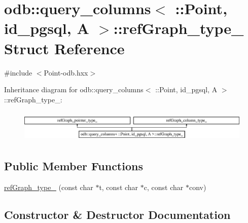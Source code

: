 \hypertarget{structodb_1_1query__columns_3_01_1_1_point_00_01id__pgsql_00_01_a_01_4_1_1ref_graph__type__}{}\section{odb\+:\+:query\+\_\+columns$<$ \+:\+:Point, id\+\_\+pgsql, A $>$\+:\+:ref\+Graph\+\_\+type\+\_\+ Struct Reference}
\label{structodb_1_1query__columns_3_01_1_1_point_00_01id__pgsql_00_01_a_01_4_1_1ref_graph__type__}


{\ttfamily \#include $<$Point-\/odb.\+hxx$>$}

Inheritance diagram for odb\+:\+:query\+\_\+columns$<$ \+:\+:Point, id\+\_\+pgsql, A $>$\+:\+:ref\+Graph\+\_\+type\+\_\+\+:\begin{figure}[H]
\begin{center}
\leavevmode
\includegraphics[height=1.564246cm]{d5/d88/structodb_1_1query__columns_3_01_1_1_point_00_01id__pgsql_00_01_a_01_4_1_1ref_graph__type__}
\end{center}
\end{figure}
\subsection*{Public Member Functions}
\begin{DoxyCompactItemize}
\item 
\hyperlink{structodb_1_1query__columns_3_01_1_1_point_00_01id__pgsql_00_01_a_01_4_1_1ref_graph__type___a16c2558c439b0286843d432589e9ee2e}{ref\+Graph\+\_\+type\+\_\+} (const char $\ast$t, const char $\ast$c, const char $\ast$conv)
\end{DoxyCompactItemize}


\subsection{Constructor \& Destructor Documentation}
\hypertarget{structodb_1_1query__columns_3_01_1_1_point_00_01id__pgsql_00_01_a_01_4_1_1ref_graph__type___a16c2558c439b0286843d432589e9ee2e}{}
